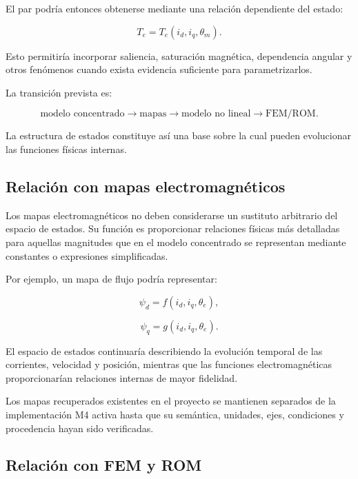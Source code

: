 El par podría entonces obtenerse mediante una relación dependiente del estado:

\begin{equation}
T_e
=
T_e(i_d,i_q,\theta_m).
\end{equation}

Esto permitiría incorporar saliencia, saturación magnética, dependencia angular y otros fenómenos cuando exista evidencia suficiente para parametrizarlos.

La transición prevista es:

\begin{equation}
\text{modelo concentrado}
\rightarrow
\text{mapas}
\rightarrow
\text{modelo no lineal}
\rightarrow
\text{FEM/ROM}.
\end{equation}

La estructura de estados constituye así una base sobre la cual pueden evolucionar las funciones físicas internas.

\subsection{Relación con mapas electromagnéticos}

Los mapas electromagnéticos no deben considerarse un sustituto arbitrario del espacio de estados. Su función es proporcionar relaciones físicas más detalladas para aquellas magnitudes que en el modelo concentrado se representan mediante constantes o expresiones simplificadas.

Por ejemplo, un mapa de flujo podría representar:

\begin{equation}
\psi_d=f(i_d,i_q,\theta_e),
\end{equation}

\begin{equation}
\psi_q=g(i_d,i_q,\theta_e).
\end{equation}

El espacio de estados continuaría describiendo la evolución temporal de las corrientes, velocidad y posición, mientras que las funciones electromagnéticas proporcionarían relaciones internas de mayor fidelidad.

Los mapas recuperados existentes en el proyecto se mantienen separados de la implementación M4 activa hasta que su semántica, unidades, ejes, condiciones y procedencia hayan sido verificadas.

\subsection{Relación con FEM y ROM}

